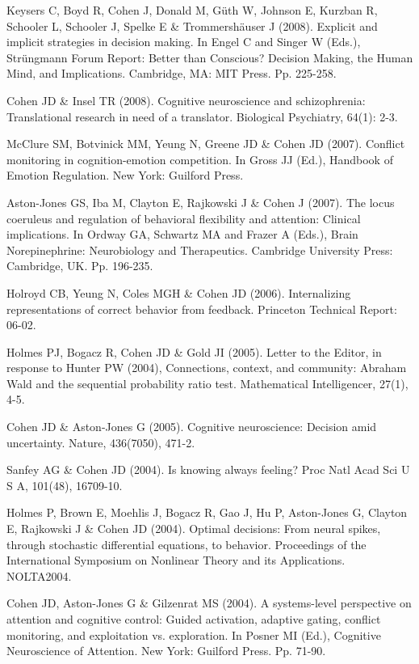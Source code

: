 \documentclass[10 pt]{article}
\begin{document}
Keysers C, Boyd R, Cohen J, Donald M, Güth W, Johnson E, Kurzban R, Schooler L, Schooler J, Spelke E \& Trommershäuser J (2008). Explicit and implicit strategies in decision making. In Engel C and Singer W (Eds.), Strüngmann Forum Report: Better than Conscious? Decision Making, the Human Mind, and Implications. Cambridge, MA: MIT Press. Pp. 225-258.

Cohen JD \& Insel TR (2008). Cognitive neuroscience and schizophrenia: Translational research in need of a translator. Biological Psychiatry, 64(1): 2-3.

McClure SM, Botvinick MM, Yeung N, Greene JD \& Cohen JD (2007). Conflict monitoring in cognition-emotion competition. In Gross JJ (Ed.), Handbook of Emotion Regulation. New York: Guilford Press.

Aston-Jones GS, Iba M, Clayton E, Rajkowski J \& Cohen J (2007). The locus coeruleus and regulation of behavioral flexibility and attention: Clinical implications. In Ordway GA, Schwartz MA and Frazer A (Eds.), Brain Norepinephrine: Neurobiology and Therapeutics. Cambridge University Press: Cambridge, UK. Pp. 196-235.

Holroyd CB, Yeung N, Coles MGH \& Cohen JD (2006). Internalizing representations of correct behavior from feedback. Princeton Technical Report: 06-02.

Holmes PJ, Bogacz R, Cohen JD \& Gold JI (2005). Letter to the Editor, in response to Hunter PW (2004), Connections, context, and community: Abraham Wald and the sequential probability ratio test. Mathematical Intelligencer, 27(1), 4-5.

Cohen JD \& Aston-Jones G (2005). Cognitive neuroscience: Decision amid uncertainty. Nature, 436(7050), 471-2.

Sanfey AG \& Cohen JD (2004). Is knowing always feeling? Proc Natl Acad Sci U S A, 101(48), 16709-10.

Holmes P, Brown E, Moehlis J, Bogacz R, Gao J, Hu P, Aston-Jones G, Clayton E, Rajkowski J \& Cohen JD (2004). Optimal decisions: From neural spikes, through stochastic differential equations, to behavior. Proceedings of the International Symposium on Nonlinear Theory and its Applications. NOLTA2004.

Cohen JD, Aston-Jones G \& Gilzenrat MS (2004). A systems-level perspective on attention and cognitive control: Guided activation, adaptive gating, conflict monitoring, and exploitation vs. exploration. In Posner MI (Ed.), Cognitive Neuroscience of Attention. New York: Guilford Press. Pp. 71-90.
\end{document}
